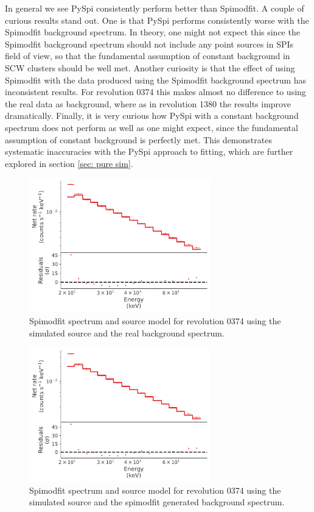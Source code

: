 \documentclass{article}
\begin{document}
In general we see PySpi consistently perform better than Spimodfit. A couple of curious results stand out. One is that PySpi performs consistently worse with the Spimodfit background spectrum. In theory, one might not expect this since the Spimodfit background spectrum should not include any point sources in SPIs field of view, so that the fundamental assumption of constant background in SCW clusters should be well met. Another curiosity is that the effect of using Spimodfit with the data produced using the Spimodfit background spectrum has inconsistent results. For revolution 0374 this makes almost no difference to using the real data as background, where as in revolution 1380 the results improve dramatically. Finally, it is very curious how PySpi with a constant background spectrum does not perform as well as one might expect, since the fundamental assumption of constant background is perfectly met. This demonstrates systematic inaccuracies with the PySpi approach to fitting, which are further explored in section \ref{sec: pure sim}.

\begin{figure}[h]
    \centering
    \includegraphics[width=0.7\textwidth]{Images/smf_spec_0374_sim_source.pdf}
    \caption{Spimodfit spectrum and source model for revolution 0374 using the simulated source and the real background spectrum.}
    \label{smf_spec_0374}
\end{figure}

\begin{figure}[h]
    \centering
    \includegraphics[width=0.7\textwidth]{Images/smf_spec_0374_sim_source_smf_bkg.pdf}
    \caption{Spimodfit spectrum and source model for revolution 0374 using the simulated source and the spimodfit generated background spectrum.}
    \label{smf_spec_0374_smf_bkg}
\end{figure}
\end{document}
